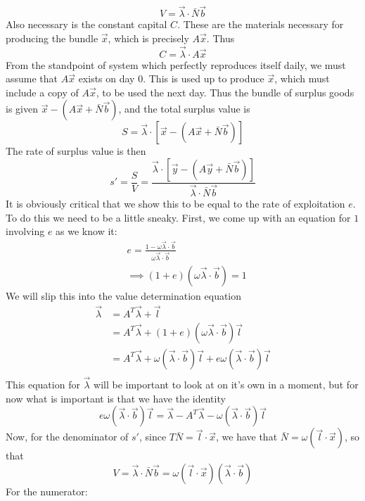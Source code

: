\documentclass{article}
\theoremstyle{definition}
\theoremstyle{plain}
\theoremstyle{theorem}
\begin{document}
\[ V = \vec{\lambda} \cdot \bar{N}\vec{b} \]  
Also necessary is the constant capital $C$. These are the materials necessary for producing the bundle $\vec{x}$, which is precisely $A\vec{x}$. Thus
\[ C = \vec{\lambda} \cdot A\vec{x} \]
From the standpoint of system which perfectly reproduces itself daily, we must assume that $A\vec{x}$ exists on day $0$. This is used up to produce $\vec{x}$, which must include a copy of $A\vec{x}$, to be used the next day. Thus the bundle of surplus goods is given $\vec{x} - (A\vec{x} + \bar{N}\vec{b})$, and the total surplus value is
\[ S = \vec{\lambda}\cdot [\vec{x} - (A\vec{x} + \bar{N}\vec{b})] \]
The rate of surplus value is then
\[ s' = \frac{S}{V} = \frac{\vec{\lambda}\cdot [\vec{y} - (A\vec{y} + \bar{N}\vec{b})]}{\vec{\lambda} \cdot \bar{N}\vec{b}} \] 
It is obviously critical that we show this to be equal to the rate of exploitation $e$. To do this we need to be a little sneaky. First, we come up with an equation for $1$ involving $e$ as we know it:
\begin{align*}
	& e = \frac{1-\omega\vec{\lambda}\cdot \vec{b}}{\omega\vec{\lambda}\cdot \vec{b}}\\
	&\implies (1+e)(\omega\vec{\lambda}\cdot \vec{b}) = 1
\end{align*}
We will slip this into the value determination equation
\begin{align*}
	\vec{\lambda} &= A^T\vec{\lambda} + \vec{l} \\
	&= A^T\vec{\lambda} + (1+e)(\omega\vec{\lambda}\cdot \vec{b})\vec{l} \\
	&= A^T\vec{\lambda} + \omega(\vec{\lambda}\cdot\vec{b})\vec{l} + e\omega(\vec{\lambda}\cdot\vec{b})\vec{l} \\
\end{align*}
This equation for $\vec{\lambda}$ will be important to look at on it's own in a moment, but for now what is important is that we have the identity
\[ e\omega(\vec{\lambda}\cdot\vec{b})\vec{l} = \vec{\lambda} - A^T\vec{\lambda} - \omega(\vec{\lambda}\cdot\vec{b})\vec{l} \]
Now, for the denominator of $s'$, since $T\bar{N} = \vec{l}\cdot \vec{x}$, we have that $\bar{N} = \omega (\vec{l} \cdot \vec{x})$, so that 
\[ V = \vec{\lambda} \cdot \bar{N}\vec{b} = \omega (\vec{l} \cdot \vec{x})(\vec{\lambda} \cdot \vec{b}) \]
For the numerator:
\end{document}
